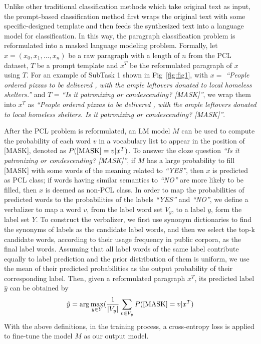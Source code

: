 \documentclass[11pt]{article}
\begin{document}
Unlike other traditional classification methods which take original text as input, the prompt-based classification method first wraps the original text with some specific-designed template and then feeds the synthesized text into a language model for classification.
In this way, the paragraph classification problem is reformulated into a masked language modeling problem.
Formally, let $x = (x_0, x_1, ..., x_n)$ be a raw paragraph with a length of $n$ from the PCL dataset, $T$ be a prompt template and $x^T$ be the reformulated paragraph of $x$ using $T$.
For an example of SubTask 1 shown in Fig~\ref{fig:fig1}, with $x=$ \emph{``People  ordered pizzas to be delivered , with the ample leftovers donated to local homeless shelters.''} and $T$ = \emph{``Is it patronizing or condescending? [MASK]''}, we wrap them into $x^T$ as \emph{``People  ordered pizzas to be delivered , with the ample leftovers donated to local homeless shelters. Is it patronizing or condescending? [MASK]''}.

After the PCL problem is reformulated, an LM model $M$ can be used to compute the probability of each word $v$ in a vocabulary list to appear in the position of [MASK], denoted as $P({\rm[MASK]}=v|x^T)$. 
To answer the cloze question \emph{``Is it patronizing or condescending? [MASK]''}, if $M$ has a large probability to fill [MASK] with some words of the meaning related to \emph{``YES''}, then $x$ is predicted as PCL class; if words having similar semantics to \emph{``NO''} are more likely to be filled, then $x$ is deemed as non-PCL class.
In order to map the probabilities of predicted words to the probabilities of the labels \emph{``YES''} and \emph{``NO''}, we define a verbalizer to map a word $v$, from the label word set $V_y$, to a label $y$, form the label set $Y$.
To construct the verbalizer, we first use synonym dictionaries to find the synonyms of labels as the candidate label words, and then we select the top-k candidate words, according to their usage frequency in public corpora, as the final label words.
Assuming that all label words of the same label contribute equally to label prediction and the prior distribution of them is uniform, we use the mean of their predicted probabilities as the output probability of their corresponding label.
Then, given a reformulated paragraph $x^T$, its predicted label $\hat{y}$ can be obtained by
\begin{equation*}
  \hat{y} = \arg\max_{y \in Y} ( \frac{1}{|V_y|} \sum\limits_{v\in V_y} P({\rm [MASK]}=v|x^T) \notag
\end{equation*}
With the above definitions, in the training process, a cross-entropy loss is applied to fine-tune the model $M$ as our output model.
\end{document}
